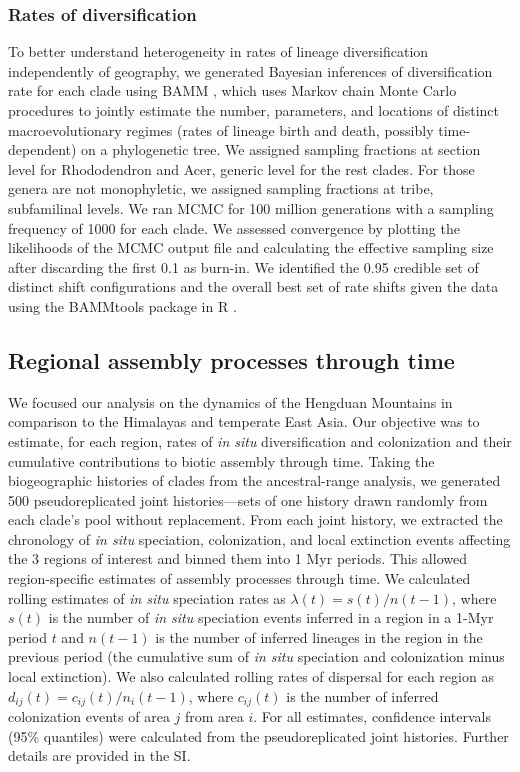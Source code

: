 \subsubsection{Rates of diversification}

To better understand heterogeneity in rates of lineage diversification independently of geography, we generated Bayesian inferences of diversification rate for each clade using BAMM \cite{Rabosky2014}, which uses Markov chain Monte Carlo procedures to jointly estimate the number, parameters, and locations of distinct macroevolutionary regimes (rates of lineage birth and death, possibly time-dependent) on a phylogenetic tree. We assigned sampling fractions at section level for Rhododendron and Acer, generic level for the rest clades. For those genera are not monophyletic, we assigned sampling fractions at tribe, subfamilinal levels. We ran MCMC for 100 million generations with a sampling frequency of 1000 for each clade. We assessed convergence by plotting the likelihoods of the MCMC output file and calculating the effective sampling size after discarding the first 0.1 as burn-in. We identified the 0.95 credible set of distinct shift configurations and the overall best set of rate shifts given the data using the BAMMtools package in R \cite{Rabosky2014}. 

\subsection{Regional assembly processes through time}

We focused our analysis on the dynamics of the Hengduan Mountains in comparison to the Himalayas and temperate East Asia. Our objective was to estimate, for each region, rates of \textit{in situ} diversification and colonization and their cumulative contributions to biotic assembly through time. Taking the biogeographic histories of clades from the ancestral-range analysis, we generated 500 pseudoreplicated joint histories---sets of one history drawn randomly from each clade's pool without replacement. From each joint history, we extracted the chronology of \textit{in situ} speciation, colonization, and local extinction events affecting the 3 regions of interest and binned them into 1 Myr periods. This allowed region-specific estimates of assembly processes through time. We calculated rolling estimates of \textit{in situ} speciation rates as $\lambda(t) = s(t)/n(t-1)$, where $s(t)$ is the number of \textit{in situ} speciation events inferred in a region in a 1-Myr period $t$ and $n(t-1)$ is the number of inferred lineages in the region in the previous period (the cumulative sum of \textit{in situ} speciation and colonization minus local extinction). We also calculated rolling rates of dispersal for each region as $d_{ij}(t) = c_{ij}(t)/n_i(t-1)$, where $c_{ij}(t)$ is the number of inferred colonization events of area $j$ from area $i$. For all estimates, confidence intervals (95\% quantiles) were calculated from the pseudoreplicated joint histories. Further details are provided in the SI.